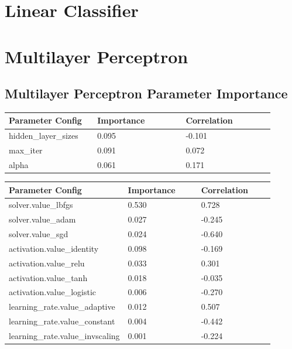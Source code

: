 \documentclass[11pt]{article}
\begin{document}
\begin{appendices}
  
  \FloatBarrier
\newpage
\section{Linear Classifier}


\FloatBarrier
\newpage
\section{Multilayer Perceptron}

\subsection{Multilayer Perceptron Parameter Importance}
  \begin{table}[ht]
    \centering
    \begin{tabular}{|p{0.3\linewidth} | p{0.3\linewidth}| p{0.3\linewidth}|} 
      \hline
      \textbf{Parameter Config}  & \textbf{Importance} & \textbf{Correlation} \\ \hline
        hidden\_layer\_sizes & 0.095 & -0.101 \\ \hline
        max\_iter & 0.091 & 0.072 \\ \hline
        alpha & 0.061 & 0.171 \\ \hline
    \end{tabular}
  \end{table}\label{MLP_ParamImp1}

  
  \begin{table}[ht]
    \centering
    \begin{tabular}{|p{0.3\linewidth} | p{0.3\linewidth}| p{0.3\linewidth}|} 
      \hline
      \textbf{Parameter Config}  & \textbf{Importance} & \textbf{Correlation} \\ \hline
        solver.value\_lbfgs & 0.530 & 0.728 \\ \hline
        solver.value\_adam & 0.027 & -0.245 \\ \hline
        solver.value\_sgd & 0.024 & -0.640 \\ \hline
        activation.value\_identity & 0.098 & -0.169 \\ \hline
        activation.value\_relu & 0.033 & 0.301 \\ \hline
        activation.value\_tanh & 0.018 & -0.035 \\ \hline
        activation.value\_logistic & 0.006 & -0.270 \\ \hline
        learning\_rate.value\_adaptive & 0.012 & 0.507 \\ \hline
        learning\_rate.value\_constant & 0.004 & -0.442 \\ \hline
        learning\_rate.value\_invscaling & 0.001 & -0.224 \\ \hline
    \end{tabular}
  \end{table}\label{MLP_ParamImp2}


\end{appendices}
\end{document}

